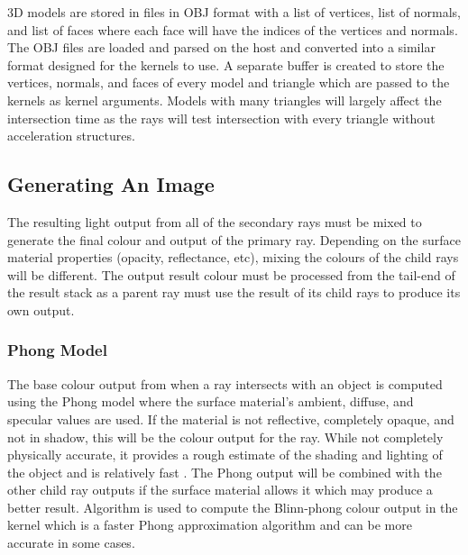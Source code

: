 \documentclass[final]{cmpreport}
\begin{document}
3D models are stored in files in OBJ format with a list of vertices, list of normals, and list of faces where each face will have the indices of the vertices and normals. The OBJ files are loaded and parsed on the host and converted into a similar format designed for the kernels to use. A separate buffer is created to store the vertices, normals, and faces of every model and triangle which are passed to the kernels as kernel arguments. Models with many triangles will largely affect the intersection time as the rays will test intersection with every triangle without acceleration structures.

\subsection{Generating An Image}

The resulting light output from all of the secondary rays must be mixed to generate the final colour and output of the primary ray. Depending on the surface material properties (opacity, reflectance, etc), mixing the colours of the child rays will be different. The output result colour must be processed from the tail-end of the result stack as a parent ray must use the result of its child rays to produce its own output.

\subsubsection{Phong Model}

The base colour output from when a ray intersects with an object is computed using the Phong model where the surface material's ambient, diffuse, and specular values are used. If the material is not reflective, completely opaque, and not in shadow, this will be the colour output for the ray. While not completely physically accurate, it provides a rough estimate of the shading and lighting of the object and is relatively fast \citep{bishop1986fast}. The Phong output will be combined with the other child ray outputs if the surface material allows it which may produce a better result. Algorithm  is used to compute the Blinn-phong colour output in the kernel \citep{blinn1977models} which is a faster Phong approximation algorithm and can be more accurate in some cases.
\end{document}
